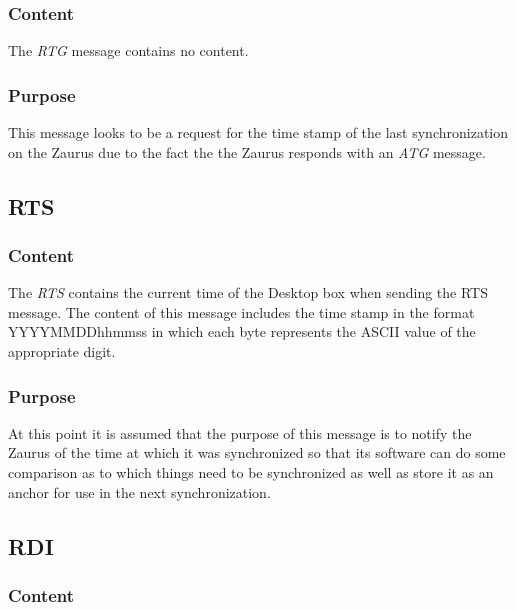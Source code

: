             \subsubsection{Content}

            The \emph{RTG} message contains no content.
            
            \subsubsection{Purpose}

            This message looks to be a request for the time stamp of the last
            synchronization on the Zaurus due to the fact the the Zaurus
            responds with an \emph{ATG} message.

        \subsection{RTS}
        
            \subsubsection{Content}
            
            The \emph{RTS} contains the current time
            of the Desktop box when sending the RTS message.
            The content of this message includes the time stamp in the format
            YYYYMMDDhhmmss in which each byte represents the ASCII value of
            the appropriate digit.

            \subsubsection{Purpose}

            At this point it is assumed that the purpose of this message
            is to notify the Zaurus of the time at which it was synchronized
            so that its software can do some comparison as to which things
            need to be synchronized as well as store it as an anchor for use
            in the next synchronization.

        \subsection{RDI}

            \subsubsection{Content}

